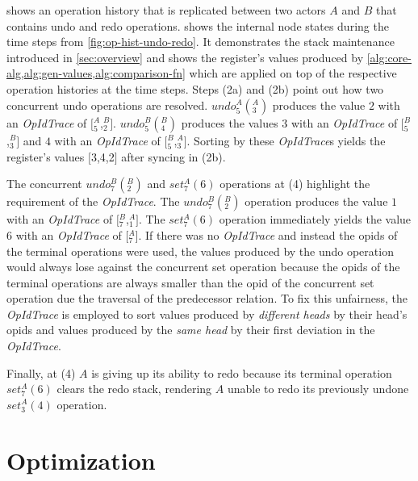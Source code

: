 \documentclass[sigplan,natbib=false,review]{acmart}
\newcommand{\opid}[2]{$\mathit{_{#1}^{#2}}$}
\newcommand{\setop}[4][set]{$\mathit{#1_{#2}^{#3}}{(#4)}$}
\newcommand{\undop}[5][undo]{$\mathit{#1_{#2}^{#3}}{(_{#4}^{#5})}$}
\newcommand{\stack}[1]{$[$#1$]$}
\newcommand{\opidtrace}{\textit{OpIdTrace}}
\begin{document}
 shows an operation history that is replicated
between two actors $A$ and $B$ that contains undo and redo operations.
 shows the internal node states during the time steps
from \cref{fig:op-hist-undo-redo}.
It demonstrates the stack maintenance introduced in \cref{sec:overview} and
shows the register's values produced by
\cref{alg:core-alg,alg:gen-values,alg:comparison-fn} which are applied on top
of the respective operation histories at the time steps.
Steps (2a) and (2b) point out how two concurrent undo operations are resolved.
\undop{5}{A}{3}{A} produces the value $2$ with an \opidtrace{} of
\stack{\opid{5}{A},\opid{2}{B}}.
\undop{5}{B}{4}{B} produces the values $3$ with an \opidtrace{} of
\stack{\opid{5}{B},\opid{3}{B}}
and $4$ with an \opidtrace{} of
\stack{\opid{5}{B},\opid{3}{A}}.
Sorting by these \opidtrace{}s yields the register's values \stack{3,4,2}
after syncing in (2b).

The concurrent \undop{7}{B}{2}{B} and \setop{7}{A}{6} operations at (4) highlight
the requirement of the \opidtrace{}.
The \undop{7}{B}{2}{B} operation produces the value $1$ with an \opidtrace{} of
\stack{\opid{7}{B},\opid{1}{A}}.
The \setop{7}{A}{6} operation immediately yields the value $6$ with an
\opidtrace{} of \stack{\opid{7}{A}}.
If there was no \opidtrace{} and instead the \glspl*{opid} of the terminal
operations were used, the values produced by the undo operation would
always lose against the concurrent set operation because the \glspl*{opid} of the
terminal operations are always smaller than the \gls*{opid} of the concurrent
set operation due the traversal of the predecessor relation.
To fix this unfairness, the \opidtrace{} is employed to sort values produced by
\emph{different heads} by their head's \glspl*{opid} and
values produced by the \emph{same head}
by their first deviation in the \opidtrace{}.

Finally, at (4) $A$ is giving up its ability to redo because its terminal
operation \setop{7}{A}{6} clears the redo stack, rendering $A$ unable to redo its
previously undone \setop{3}{A}{4} operation.

\section{Optimization}\label{sec:opt}

\end{document}

